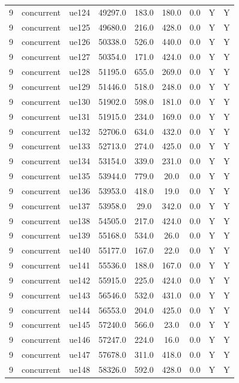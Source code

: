 \begin{table}[ht]
\begin{tabular}{|c|c|c|c|c|c|c|c|c|}
9 & concurrent & ue124 & 49297.0 & 183.0 & 180.0 & 0.0 & Y & Y \\
9 & concurrent & ue125 & 49680.0 & 216.0 & 428.0 & 0.0 & Y & Y \\
9 & concurrent & ue126 & 50338.0 & 526.0 & 440.0 & 0.0 & Y & Y \\
9 & concurrent & ue127 & 50354.0 & 171.0 & 424.0 & 0.0 & Y & Y \\
9 & concurrent & ue128 & 51195.0 & 655.0 & 269.0 & 0.0 & Y & Y \\
9 & concurrent & ue129 & 51446.0 & 518.0 & 248.0 & 0.0 & Y & Y \\
9 & concurrent & ue130 & 51902.0 & 598.0 & 181.0 & 0.0 & Y & Y \\
9 & concurrent & ue131 & 51915.0 & 234.0 & 169.0 & 0.0 & Y & Y \\
9 & concurrent & ue132 & 52706.0 & 634.0 & 432.0 & 0.0 & Y & Y \\
9 & concurrent & ue133 & 52713.0 & 274.0 & 425.0 & 0.0 & Y & Y \\
9 & concurrent & ue134 & 53154.0 & 339.0 & 231.0 & 0.0 & Y & Y \\
9 & concurrent & ue135 & 53944.0 & 779.0 & 20.0 & 0.0 & Y & Y \\
9 & concurrent & ue136 & 53953.0 & 418.0 & 19.0 & 0.0 & Y & Y \\
9 & concurrent & ue137 & 53958.0 & 29.0 & 342.0 & 0.0 & Y & Y \\
9 & concurrent & ue138 & 54505.0 & 217.0 & 424.0 & 0.0 & Y & Y \\
9 & concurrent & ue139 & 55168.0 & 534.0 & 26.0 & 0.0 & Y & Y \\
9 & concurrent & ue140 & 55177.0 & 167.0 & 22.0 & 0.0 & Y & Y \\
9 & concurrent & ue141 & 55536.0 & 188.0 & 167.0 & 0.0 & Y & Y \\
9 & concurrent & ue142 & 55915.0 & 225.0 & 424.0 & 0.0 & Y & Y \\
9 & concurrent & ue143 & 56546.0 & 532.0 & 431.0 & 0.0 & Y & Y \\
9 & concurrent & ue144 & 56553.0 & 204.0 & 425.0 & 0.0 & Y & Y \\
9 & concurrent & ue145 & 57240.0 & 566.0 & 23.0 & 0.0 & Y & Y \\
9 & concurrent & ue146 & 57247.0 & 224.0 & 16.0 & 0.0 & Y & Y \\
9 & concurrent & ue147 & 57678.0 & 311.0 & 418.0 & 0.0 & Y & Y \\
9 & concurrent & ue148 & 58326.0 & 592.0 & 428.0 & 0.0 & Y & Y \\

\end{tabular}
\end{table}

